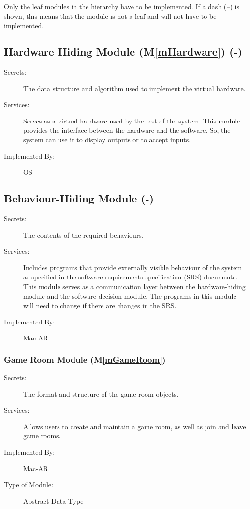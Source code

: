 \documentclass[12pt, titlepage]{article}
\newcommand{\mref}[1]{M\ref{#1}}
\begin{document}
Only the leaf modules in the hierarchy have to be implemented. If a dash
(\emph{--}) is shown, this means that the module is not a leaf and will not have
to be implemented.

\subsection{Hardware Hiding Module (\mref{mHardware}) (-)}

\begin{description}
\item[Secrets:]The data structure and algorithm used to implement the virtual
  hardware.
\item[Services:]Serves as a virtual hardware used by the rest of the
  system. This module provides the interface between the hardware and the
  software. So, the system can use it to display outputs or to accept inputs.
\item[Implemented By:] OS
\end{description}

\subsection{Behaviour-Hiding Module (-)}

\begin{description}
\item[Secrets:]The contents of the required behaviours.
\item[Services:]Includes programs that provide externally visible behaviour of
  the system as specified in the software requirements specification (SRS)
  documents. This module serves as a communication layer between the
  hardware-hiding module and the software decision module. The programs in this
  module will need to change if there are changes in the SRS.
\item[Implemented By:] Mac-AR
\end{description}

\subsubsection{Game Room Module (\mref{mGameRoom})}

\begin{description}
\item[Secrets:]The format and structure of the game room objects.
\item[Services:] Allows users to create and maintain a game room, as well as join and leave game rooms. 
\item[Implemented By:] Mac-AR
\item[Type of Module:] Abstract Data Type
\end{description}
\end{document}
